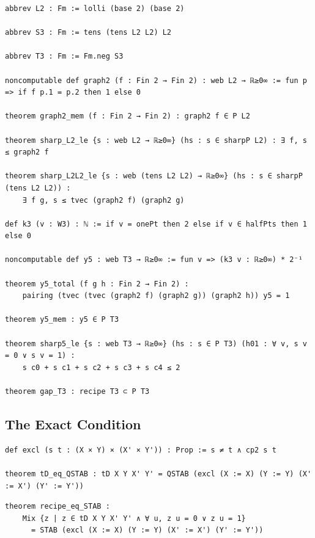\label{lean:gap-t3}
\begin{lstlisting}
abbrev L2 : Fm := lolli (base 2) (base 2)

abbrev S3 : Fm := tens (tens L2 L2) L2

abbrev T3 : Fm := Fm.neg S3

noncomputable def graph2 (f : Fin 2 → Fin 2) : web L2 → ℝ≥0∞ := fun p => if f p.1 = p.2 then 1 else 0

theorem graph2_mem (f : Fin 2 → Fin 2) : graph2 f ∈ P L2

theorem sharp_L2_le {s : web L2 → ℝ≥0∞} (hs : s ∈ sharpP L2) : ∃ f, s ≤ graph2 f

theorem sharp_L2L2_le {s : web (tens L2 L2) → ℝ≥0∞} (hs : s ∈ sharpP (tens L2 L2)) :
    ∃ f g, s ≤ tvec (graph2 f) (graph2 g)

def k3 (v : W3) : ℕ := if v = onePt then 2 else if v ∈ halfPts then 1 else 0

noncomputable def y5 : web T3 → ℝ≥0∞ := fun v => (k3 v : ℝ≥0∞) * 2⁻¹

theorem y5_total (f g h : Fin 2 → Fin 2) :
    pairing (tvec (tvec (graph2 f) (graph2 g)) (graph2 h)) y5 = 1

theorem y5_mem : y5 ∈ P T3

theorem sharp5_le {s : web T3 → ℝ≥0∞} (hs : s ∈ P T3) (h01 : ∀ v, s v = 0 ∨ s v = 1) :
    s c0 + s c1 + s c2 + s c3 + s c4 ≤ 2

theorem gap_T3 : recipe T3 ⊂ P T3
\end{lstlisting}

\subsection{The Exact Condition}

\label{lean:td-eq-qstab}
\begin{lstlisting}
def excl (s t : (X × Y) × (X' × Y')) : Prop := s ≠ t ∧ cp2 s t

theorem tD_eq_QSTAB : tD X Y X' Y' = QSTAB (excl (X := X) (Y := Y) (X' := X') (Y' := Y'))
\end{lstlisting}

\label{lean:recipe-eq-stab}
\begin{lstlisting}
theorem recipe_eq_STAB :
    Mix {z | z ∈ tD X Y X' Y' ∧ ∀ u, z u = 0 ∨ z u = 1}
      = STAB (excl (X := X) (Y := Y) (X' := X') (Y' := Y'))
\end{lstlisting}

